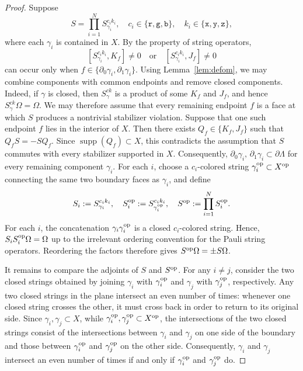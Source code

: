 \documentclass[a4paper,11pt]{article}
\theoremstyle{definition}
\theoremstyle{remark}
\theoremstyle{remark}
\begin{document}
\begin{proof}
    Suppose
    \[
        S = \prod_{i=1}^N S_{\gamma_i}^{c_i k_i}, \quad c_i\in\{\mathtt r,\mathtt g,\mathtt b\}, \quad k_i\in\{\mathtt x,\mathtt y,\mathtt z\},
    \]
    where each $\gamma_i$ is contained in $X$. By the property of string operators,
    \[
        [S_{\gamma_i}^{c_i k_i},K_f]\neq0
        \quad\text{or}\quad
        [S_{\gamma_i}^{c_i k_i},J_f]\neq0
    \]
    can occur only when $f\in \{\partial_0\gamma_i,\partial_1\gamma_i\}$. Using Lemma~\ref{lem:defom}, we may combine components with common endpoints and remove closed components. Indeed, if $\gamma$ is closed, then $S_\gamma^{ck}$ is a product of some $K_f$ and $J_f$, and hence $S_\gamma^{ck}\Omega=\Omega$. We may therefore assume that every remaining endpoint $f$ is a face at which $S$ produces a nontrivial stabilizer violation. Suppose that one such endpoint $f$ lies in the interior of $X$. Then there exists $Q_f\in\{K_f,J_f\}$ such that $Q_fS=-SQ_f$. Since $\operatorname{supp}(Q_f)\subset X$, this contradicts the assumption that $S$ commutes with every stabilizer supported in $X$. Consequently, $\partial_0\gamma_i,\, \partial_1\gamma_i \subset\partial\Lambda$ for every remaining component $\gamma_i$. For each $i$, choose a $c_i$-colored string $\gamma_i^{\rm op}\subset X^{\rm op}$ connecting the same two boundary faces as $\gamma_i$, and define
    \[
        S_i:=S_{\gamma_i}^{c_i k_i}, \quad S_i^{\rm op} := S_{\gamma_i^{\rm op}}^{c_i k_i}, \quad S^{\rm op} := \prod_{i=1}^N S_i^{\rm op}.
    \]
    For each $i$, the concatenation $\gamma_i\gamma_i^{\rm op}$ is a closed $c_i$-colored string. Hence, $S_iS_i^{\rm op}\Omega=\Omega$ up to the irrelevant ordering convention for the Pauli string operators. Reordering the factors therefore gives $S^{\rm op}\Omega = \pm S\Omega$. 

    It remains to compare the adjoints of $S$ and $S^{\rm op}$. For any $i\neq j$, consider the two closed strings obtained by joining $\gamma_i$ with $\gamma_i^{\rm op}$ and $\gamma_j$ with $\gamma_j^{\rm op}$, respectively. Any two closed strings in the plane intersect an even number of times: whenever one closed string crosses the other, it must cross back in order to return to its original side. Since $\gamma_i,\gamma_j\subset X$, while $\gamma_i^{\rm op},\gamma_j^{\rm op}\subset X^{\rm op}$, the intersections of the two closed strings consist of the intersections between $\gamma_i$ and $\gamma_j$ on one side of the boundary and those between $\gamma_i^{\rm op}$ and $\gamma_j^{\rm op}$ on the other side. Consequently, $\gamma_i$ and $\gamma_j$ intersect an even number of times if and only if $\gamma_i^{\rm op}$ and $\gamma_j^{\rm op}$ do.


\end{proof}
\end{document}
